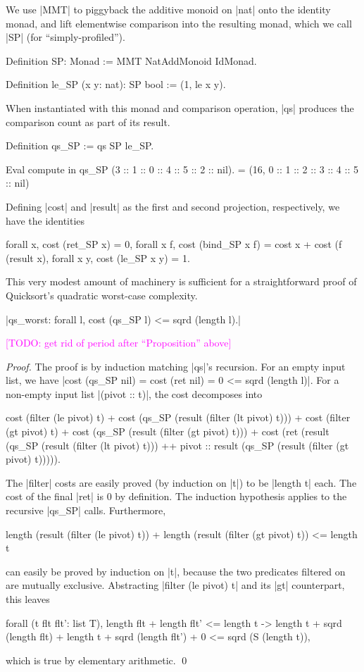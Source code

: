 \documentclass[runningheads]{llncs}
\newcommand{\todo}[1]{\textcolor{magenta}{[TODO: #1]}}
\begin{document}
We use |MMT| to piggyback the additive monoid on |nat| onto the identity monad, and lift elementwise comparison into the resulting monad, which we call |SP| (for ``simply-profiled'').
\begin{code}
  Definition SP: Monad := MMT NatAddMonoid IdMonad.

  Definition le_SP (x y: nat): SP bool := (1, le x y).
\end{code}
When instantiated with this monad and comparison operation, |qs| produces the comparison count as part of its result.
\begin{code}
  Definition qs_SP := qs SP le_SP.

  Eval compute in qs_SP (3 :: 1 :: 0 :: 4 :: 5 :: 2 :: nil).
    = (16, 0 :: 1 :: 2 :: 3 :: 4 :: 5 :: nil)
\end{code}
Defining |cost| and |result| as the first and second projection, respectively, we have the identities
\begin{code}
  forall x, cost (ret_SP x) = 0,
  forall x f, cost (bind_SP x f) = cost x + cost (f (result x),
  forall x y, cost (le_SP x y) = 1.
\end{code}
This very modest amount of machinery is sufficient for a straightforward proof of Quicksort's quadratic worst-case complexity.

\begin{propo}|qs_worst: forall l, cost (qs_SP l) <= sqrd (length l).|\end{propo}
  \todo{get rid of period after ``Proposition'' above}
\begin{proof}
  The proof is by induction matching |qs|'s recursion. For an empty input list, we have |cost (qs_SP nil) = cost (ret nil) = 0 <= sqrd (length l)|. For a non-empty input list |(pivot :: t)|, the cost decomposes into
  \begin{code}
    cost (filter (le pivot) t) + cost (qs_SP (result (filter (lt pivot) t))) +
    cost (filter (gt pivot) t) + cost (qs_SP (result (filter (gt pivot) t))) +
    cost (ret (result (qs_SP (result (filter (lt pivot) t))) ++
     pivot :: result (qs_SP (result (filter (gt pivot) t))))).
  \end{code}
  The |filter| costs are easily proved (by induction on |t|) to be |length t| each. The cost of the final |ret| is 0 by definition. The induction hypothesis applies to the recursive |qs_SP| calls. Furthermore,
  \begin{code}
  length (result (filter (le pivot) t)) +
  length (result (filter (gt pivot) t)) <= length t
  \end{code}
  can easily be proved by induction on |t|, because the two predicates filtered on are mutually exclusive. Abstracting |filter (le pivot) t| and its |gt| counterpart, this leaves
  \begin{code}
    forall (t flt flt': list T), length flt + length flt' <= length t ->
      length t + sqrd (length flt) + length t + sqrd (length flt')  + 0 <= sqrd (S (length t)),
  \end{code}
  which is true by elementary arithmetic. \qed
\end{proof}
\end{document}
